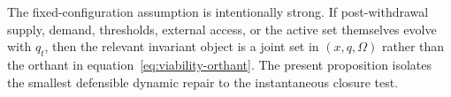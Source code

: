 The fixed-configuration assumption is intentionally strong. If post-withdrawal supply, demand, thresholds, external access, or the active set themselves evolve with $q_t$, then the relevant invariant object is a joint set in $(x,q,\Omega)$ rather than the orthant in equation~\eqref{eq:viability-orthant}. The present proposition isolates the smallest defensible dynamic repair to the instantaneous closure test.
